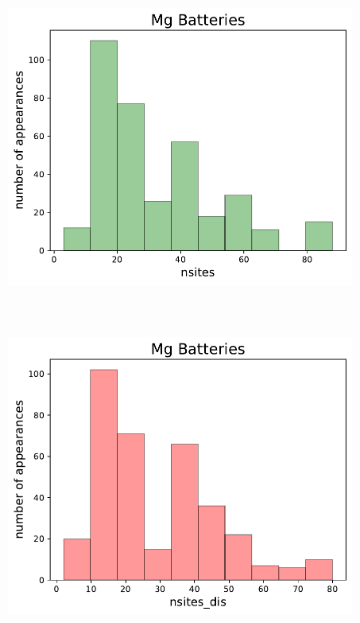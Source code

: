 \begin{figure}[h]
\begin{subfigure}{0.2\textwidth}
     \end{subfigure}
          ~ 
               \begin{subfigure}{0.2\textwidth}
         \centering
         \includegraphics[width=\linewidth]{result/figures/distribution/columnsplotMg2_nsites.pdf}
         
     \end{subfigure}
          ~ 
     \begin{subfigure}{0.2\textwidth}
         \centering
         \includegraphics[width=\linewidth]{result/figures/distribution/columnsplotMg_nsites_dis.pdf}
         

\end{subfigure}
\end{figure}
